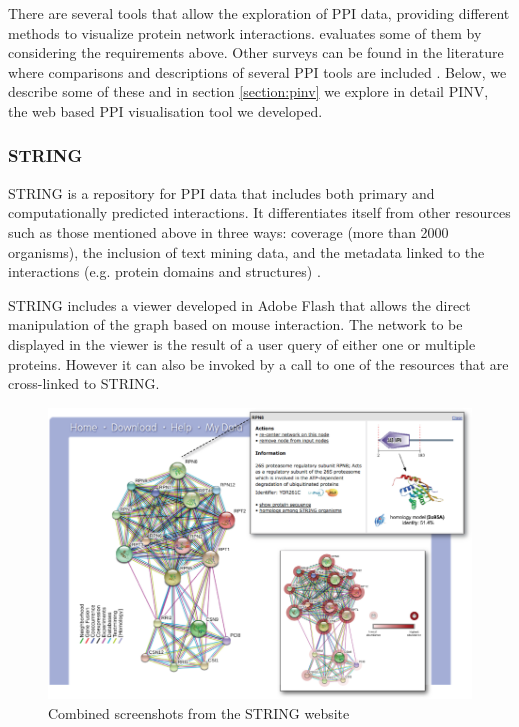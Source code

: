 There are several tools that allow the exploration of PPI data, providing different methods to visualize protein network interactions. \cite{AGA2013} evaluates some of them by considering the requirements above. Other surveys can be found in the literature where comparisons and descriptions of several PPI tools are included \cite{SUD2007, PAV2008, GEH2010}. Below, we describe some of these and in section \ref{section:pinv} we explore in detail PINV, the web based PPI visualisation tool we developed. 

\subsubsection{STRING}
STRING is a repository for PPI data that includes both primary and computationally predicted interactions. It differentiates itself from other resources such as those mentioned above in three ways: coverage (more than 2000 organisms), the inclusion of text mining data, and the metadata linked to the interactions (e.g. protein domains and structures) \cite{FRA2013}.

STRING includes a viewer developed in Adobe Flash that allows the direct manipulation of the graph based on mouse interaction. The network to be displayed in the viewer is the result of a user query of either one or multiple proteins. However it can also be invoked by a call to one of the resources that are cross-linked to STRING.

\begin{figure}  
\centering
\includegraphics[width=\textwidth]{figures/string.png}
\caption[STRING Snapshot.]{Combined screenshots from the STRING website
\label{fig:string}}
\end{figure}

